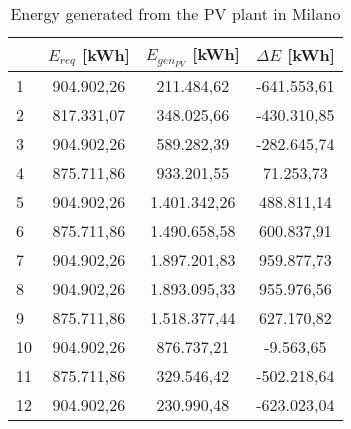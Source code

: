 \begin{table}[hp]
\centering
\begin{tabular}{|l|c|c|c|}
\hline
\rowcolor{bluepoli!40}\multicolumn{1}{|c|}{\textbf{Month}} & \textbf{$E_{req}$ [kWh]} & \textbf{$E_{gen_{PV}}$ [kWh]} & \textbf{$\Delta E$ [kWh]} \\ \hline
1                           & 904.902,26                    & 211.484,62              & -641.553,61               \\ \hline
2                           & 817.331,07                    & 348.025,66              & -430.310,85               \\ \hline
3                           & 904.902,26                    & 589.282,39              & -282.645,74               \\ \hline
4                           & 875.711,86                    & 933.201,55              & 71.253,73                 \\ \hline
5                           & 904.902,26                    & 1.401.342,26            & 488.811,14                \\ \hline
6                           & 875.711,86                    & 1.490.658,58            & 600.837,91                \\ \hline
7                           & 904.902,26                    & 1.897.201,83            & 959.877,73                \\ \hline
8                           & 904.902,26                    & 1.893.095,33            & 955.976,56                \\ \hline
9                           & 875.711,86                    & 1.518.377,44            & 627.170,82                \\ \hline
10                          & 904.902,26                    & 876.737,21              & -9.563,65                 \\ \hline
11                          & 875.711,86                    & 329.546,42              & -502.218,64               \\ \hline
12                          & 904.902,26                    & 230.990,48              & -623.023,04               \\ \hline
\end{tabular}
\caption{Energy generated from the PV plant in Milano}
\label{tab:pvplantmilan}
\end{table}